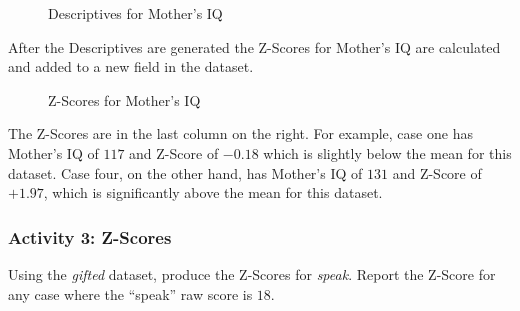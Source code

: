 \begin{figure}[H]
  \begin{center}
    \caption{Descriptives for Mother's IQ}
    \label{lab04_fig04}
  \end{center}
\end{figure}

After the Descriptives are generated the Z-Scores for Mother's IQ are calculated and added to a new field in the dataset.

\begin{figure}[H]
  \begin{center}
    \caption{Z-Scores for Mother's IQ}
    \label{lab04_fig05}
  \end{center}
\end{figure}

The Z-Scores are in the last column on the right. For example, case one has Mother's IQ of $ 117 $ and Z-Score of $ -0.18 $ which is slightly below the mean for this dataset. Case four, on the other hand, has Mother's IQ of $ 131 $ and Z-Score of $ +1.97 $, which is significantly above the mean for this dataset.

\subsubsection{Activity 3: Z-Scores} \label{lab04_act03}

Using the \textit{gifted} dataset, produce the Z-Scores for \textit{speak}. Report the Z-Score for any case where the ``speak'' raw score is $ 18 $. 

